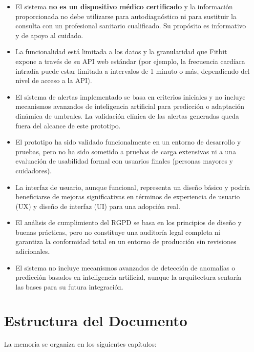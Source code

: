 \begin{itemize}
    \item El sistema \textbf{no es un dispositivo médico certificado} y la información proporcionada no debe utilizarse para autodiagnóstico ni para sustituir la consulta con un profesional sanitario cualificado. Su propósito es informativo y de apoyo al cuidado.
    \item La funcionalidad está limitada a los datos y la granularidad que Fitbit\textsuperscript{\textregistered} expone a través de su API web estándar (por ejemplo, la frecuencia cardíaca intradía puede estar limitada a intervalos de 1 minuto o más, dependiendo del nivel de acceso a la API).
    \item El sistema de alertas implementado se basa en criterios iniciales y no incluye mecanismos avanzados de inteligencia artificial para predicción o adaptación dinámica de umbrales. La validación clínica de las alertas generadas queda fuera del alcance de este prototipo.
    \item El prototipo ha sido validado funcionalmente en un entorno de desarrollo y pruebas, pero no ha sido sometido a pruebas de carga extensivas ni a una evaluación de usabilidad formal con usuarios finales (personas mayores y cuidadores).
    \item La interfaz de usuario, aunque funcional, representa un diseño básico y podría beneficiarse de mejoras significativas en términos de experiencia de usuario (UX) y diseño de interfaz (UI) para una adopción real.
    \item El análisis de cumplimiento del RGPD se basa en los principios de diseño y buenas prácticas, pero no constituye una auditoría legal completa ni garantiza la conformidad total en un entorno de producción sin revisiones adicionales.
    \item El sistema no incluye mecanismos avanzados de detección de anomalías o predicción basados en inteligencia artificial, aunque la arquitectura sentaría las bases para su futura integración.
\end{itemize}

\section{Estructura del Documento}
\label{sec:intro_estructura}

La memoria se organiza en los siguientes capítulos:

